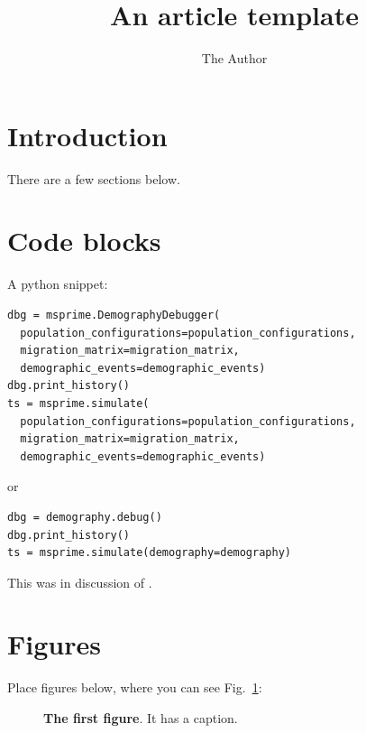 \documentclass{article}
\begin{document}
\title{An article template}
\author[1,*]{The Author}
\maketitle


\section{Introduction}

There are a few sections below.

\lipsum[2-4]

\section{Code blocks}

A python snippet:
\begin{lstlisting}[frame=single]
dbg = msprime.DemographyDebugger(
  population_configurations=population_configurations,
  migration_matrix=migration_matrix,
  demographic_events=demographic_events)
dbg.print_history()
ts = msprime.simulate(
  population_configurations=population_configurations,
  migration_matrix=migration_matrix,
  demographic_events=demographic_events)
\end{lstlisting}
or
\begin{lstlisting}[frame=single]
dbg = demography.debug()
dbg.print_history()
ts = msprime.simulate(demography=demography)
\end{lstlisting}

This was in discussion of \citet{kelleher2016efficient}.
\section{Figures}

Place figures below, where you can see Fig.~\ref{fig:1}:

\begin{figure}[ht]
\begin{center}
\caption{\textbf{The first figure}.
    It has a caption.
}
\label{fig:1}
\end{center}
\end{figure}
\end{document}
